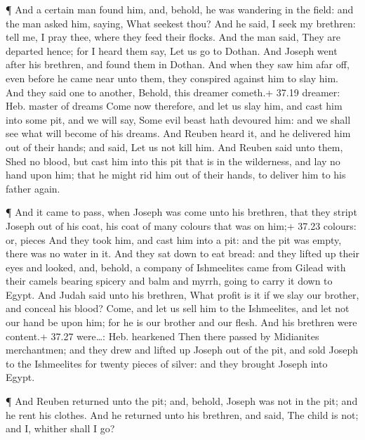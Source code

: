  ¶ And a certain man found him, and, behold, he was
wandering in the field: and the man asked him, saying, What seekest
thou?  And he said, I seek my brethren: tell me, I pray
thee, where they feed their flocks.  And the man said, They
are departed hence; for I heard them say, Let us go to Dothan. And
Joseph went after his brethren, and found them in Dothan. 
And when they saw him afar off, even before he came near unto them, they
conspired against him to slay him.  And they said one to
another, Behold, this dreamer cometh.+ 37.19 dreamer: Heb. master of
dreams  Come now therefore, and let us slay him, and cast
him into some pit, and we will say, Some evil beast hath devoured him:
and we shall see what will become of his dreams.  And
Reuben heard it, and he delivered him out of their hands; and said, Let
us not kill him.  And Reuben said unto them, Shed no blood,
but cast him into this pit that is in the wilderness, and lay no hand
upon him; that he might rid him out of their hands, to deliver him to
his father again.

 ¶ And it came to pass, when Joseph was come unto his
brethren, that they stript Joseph out of his coat, his coat of many
colours that was on him;+ 37.23 colours: or, pieces  And
they took him, and cast him into a pit: and the pit was empty, there was
no water in it.  And they sat down to eat bread: and they
lifted up their eyes and looked, and, behold, a company of Ishmeelites
came from Gilead with their camels bearing spicery and balm and myrrh,
going to carry it down to Egypt.  And Judah said unto his
brethren, What profit is it if we slay our brother, and conceal his
blood?  Come, and let us sell him to the Ishmeelites, and
let not our hand be upon him; for he is our brother and our flesh. And
his brethren were content.+ 37.27 were\ldots: Heb. hearkened
 Then there passed by Midianites merchantmen; and they drew
and lifted up Joseph out of the pit, and sold Joseph to the Ishmeelites
for twenty pieces of silver: and they brought Joseph into Egypt.

 ¶ And Reuben returned unto the pit; and, behold, Joseph
was not in the pit; and he rent his clothes.  And he
returned unto his brethren, and said, The child is not; and I, whither
shall I go?

